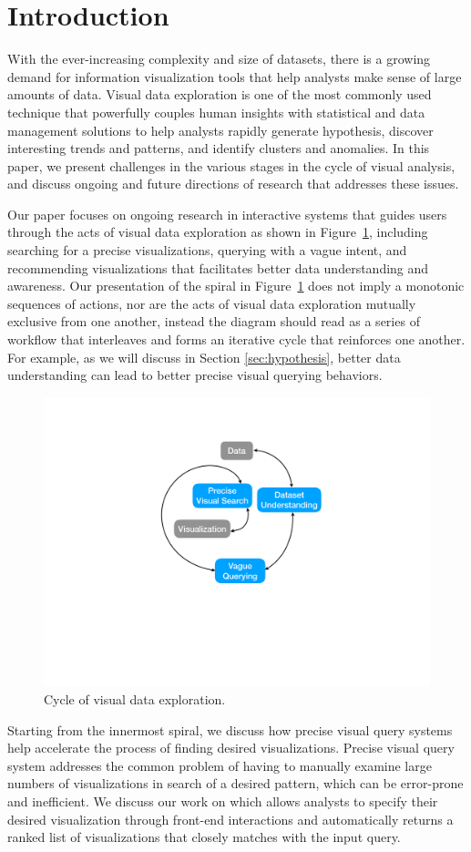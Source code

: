 \section{Introduction}%
\par With the ever-increasing complexity and size of datasets, there is a growing demand for information visualization tools that help analysts make sense of large amounts of data. Visual data exploration is one of the most commonly used technique that powerfully couples human insights with statistical and data management solutions to help analysts rapidly generate hypothesis, discover interesting trends and patterns, and identify clusters and anomalies. In this paper, we present challenges in the various stages in the cycle of visual analysis, and discuss ongoing and future directions of research that addresses these issues.
\par Our paper focuses on ongoing research in interactive systems that guides users through the acts of visual data exploration as shown in Figure~\ref{fig:cycle}, including searching for a precise visualizations, querying with a vague intent, and recommending visualizations that facilitates better data understanding and awareness. Our presentation of the spiral in Figure~\ref{fig:cycle} does not imply a monotonic sequences of actions, nor are the acts of visual data exploration mutually exclusive from one another, instead the diagram should read as a series of workflow that interleaves and forms an iterative cycle that reinforces one another. For example, as we will discuss in Section \ref{sec:hypothesis}, better data understanding can lead to better precise visual querying behaviors.
\begin{figure}[h!]
\label{fig:cycle}
\centering
\includegraphics[width=0.4\linewidth]{figures/cycle.pdf}
\caption{Cycle of visual data exploration.}
\end{figure}
\par Starting from the innermost spiral, we discuss how precise visual query systems help accelerate the process of finding desired visualizations. Precise visual query system addresses the common problem of having to manually examine large numbers of visualizations in search of a desired pattern, which can be error-prone and inefficient. We discuss our work on \zv which allows analysts to specify their desired visualization through front-end interactions and automatically returns a ranked list of visualizations that closely matches with the input query.

